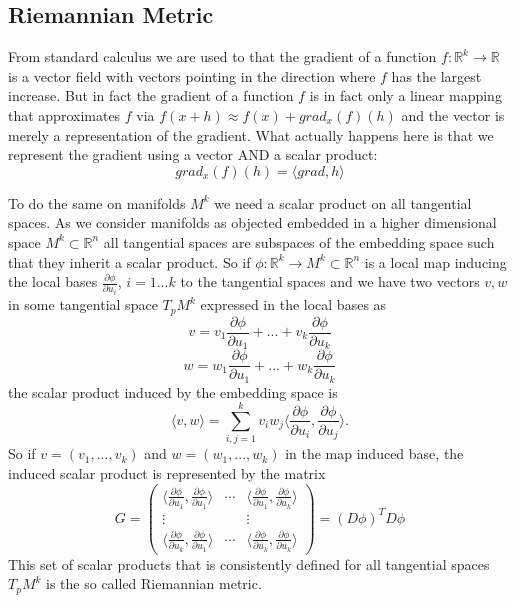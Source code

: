 \subsection{Riemannian Metric}
From standard calculus we are used to that the gradient of a function $f:\mathbb R^k \rightarrow \mathbb R$ is a vector field with vectors pointing in the direction where $f$ has the largest increase. But in fact the gradient of a function $f$ is in fact only a linear mapping that approximates $f$ via $f(x + h) \approx f(x) + grad_x(f) (h)$ and the vector is merely a representation of the gradient. What actually happens here is that we represent the gradient using a vector AND a scalar product:
\[grad_x(f) (h) = \langle grad, h\rangle\]

To do the same on manifolds $M^k$ we need a scalar product on all tangential spaces. As we consider manifolds as objected embedded in a higher dimensional space $M^k \subset \mathbb R^n$ all tangential spaces are subspaces of the embedding space such that they inherit a scalar product. So if $\phi: \mathbb R^k \rightarrow M^k \subset \mathbb R^n$ is a local map inducing the local bases $\frac{\partial \phi}{\partial u_i}$, $i= 1...k$ to the tangential spaces and we have two vectors $v, w$ in some tangential space $T_p M^k$ expressed in the local bases as
\[v= v_1 \frac{\partial \phi}{\partial u_1} +...+ v_k\frac{\partial \phi}{\partial u_k} \]
\[w = w_1 \frac{\partial \phi}{\partial u_1} +...+ w_k\frac{\partial \phi}{\partial u_k}\]
the scalar product induced by the embedding space is
\[\langle v,w \rangle = \sum_{i,j = 1}^k v_iw_j\langle \frac{\partial \phi}{\partial u_i},\frac{\partial \phi}{\partial u_j}\rangle.\]
So if $v = (v_1,...,v_k)$ and $w = (w_1,...,w_k)$ in the map induced base, the induced scalar product is represented by the matrix
\[G= \begin{pmatrix}\langle \frac{\partial \phi}{\partial u_1},\frac{\partial \phi}{\partial u_1}\rangle &\cdots& \langle \frac{\partial \phi}{\partial u_1},\frac{\partial \phi}{\partial u_k}\rangle \\
\vdots &&\vdots\\
\langle \frac{\partial \phi}{\partial u_k},\frac{\partial \phi}{\partial u_1}\rangle &\cdots& \langle \frac{\partial \phi}{\partial u_k},\frac{\partial \phi}{\partial u_k}\rangle \end{pmatrix} = (D\phi)^T D\phi\]
This set of scalar products that is consistently defined for all tangential spaces $T_p M^k$ is the so called Riemannian metric.

